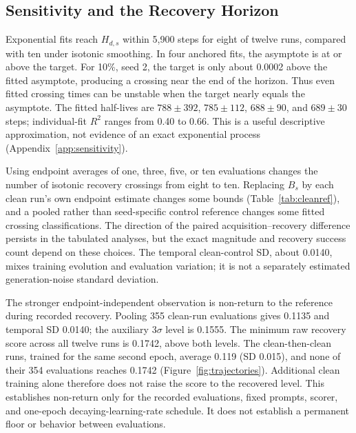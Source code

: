 \documentclass[11pt,a4paper]{article}
\begin{document}
\subsection{Sensitivity and the Recovery Horizon}
Exponential fits reach $H_{d,s}$ within 5,900 steps for eight of twelve runs, compared with ten under isotonic smoothing. In four anchored fits, the asymptote is at or above the target. For 10\%, seed 2, the target is only about 0.0002 above the fitted asymptote, producing a crossing near the end of the horizon. Thus even fitted crossing times can be unstable when the target nearly equals the asymptote. The fitted half-lives are $788\pm392$, $785\pm112$, $688\pm90$, and $689\pm30$ steps; individual-fit $R^2$ ranges from 0.40 to 0.66. This is a useful descriptive approximation, not evidence of an exact exponential process (Appendix~\ref{app:sensitivity}).

Using endpoint averages of one, three, five, or ten evaluations changes the number of isotonic recovery crossings from eight to ten. Replacing $B_s$ by each clean run's own endpoint estimate changes some bounds (Table~\ref{tab:cleanref}), and a pooled rather than seed-specific control reference changes some fitted crossing classifications. The direction of the paired acquisition--recovery difference persists in the tabulated analyses, but the exact magnitude and recovery success count depend on these choices. The temporal clean-control SD, about 0.0140, mixes training evolution and evaluation variation; it is not a separately estimated generation-noise standard deviation.

The stronger endpoint-independent observation is non-return to the reference during recorded recovery. Pooling 355 clean-run evaluations gives 0.1135 and temporal SD 0.0140; the auxiliary $3\sigma$ level is 0.1555. The minimum raw recovery score across all twelve runs is 0.1742, above both levels. The clean-then-clean runs, trained for the same second epoch, average 0.119 (SD 0.015), and none of their 354 evaluations reaches 0.1742 (Figure~\ref{fig:trajectories}). Additional clean training alone therefore does not raise the score to the recovered level. This establishes non-return only for the recorded evaluations, fixed prompts, scorer, and one-epoch decaying-learning-rate schedule. It does not establish a permanent floor or behavior between evaluations.
\end{document}
